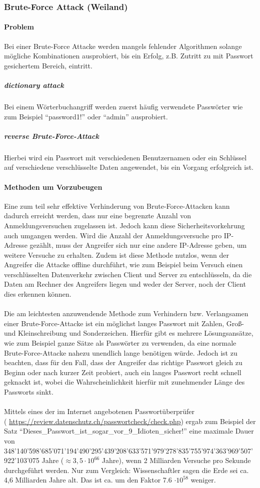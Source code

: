 \subsubsection{Brute-Force Attack (Weiland)}
\paragraph{Problem}
Bei einer Brute-Force Attacke werden mangels fehlender Algorithmen solange mögliche Kombinationen ausprobiert, bis ein Erfolg, z.B. Zutritt zu mit Passwort gesichertem Bereich, eintritt.
\subparagraph{dictionary attack}
Bei einem Wörterbuchangriff werden zuerst häufig verwendete Passwörter wie zum Beispiel \enquote{password1!} oder \enquote{admin} ausprobiert. 
\subparagraph{reverse Brute-Force-Attack}
Hierbei wird ein Passwort mit verschiedenen Benutzernamen oder ein Schlüssel auf verschiedene verschlüsselte Daten angewendet, bis ein Vorgang erfolgreich ist.
\paragraph{Methoden um Vorzubeugen}
Eine zum teil sehr effektive Verhinderung von Brute-Force-Attacken kann dadurch erreicht werden, dass nur eine begrenzte Anzahl von Anmeldungsversuchen  zugelassen ist. Jedoch kann diese Sicherheitsvorkehrung auch umgangen werden. Wird die Anzahl der Anmeldungsversuche pro IP-Adresse gezählt, muss der Angreifer sich nur eine andere IP-Adresse geben, um weitere Versuche zu erhalten. Zudem ist diese Methode nutzlos, wenn der Angreifer die Attacke offline durchführt, wie zum Beispiel beim Versuch einen verschlüsselten Datenverkehr zwischen Client und Server zu entschlüsseln, da die Daten am Rechner des Angreifers liegen und weder der Server, noch der Client dies erkennen können. \\\\
Die am leichtesten anzuwendende Methode zum Verhindern bzw. Verlangsamen einer Brute-Force-Attacke ist ein möglichst langes Passwort mit Zahlen, Groß- und Kleinschreibung und Sonderzeichen. Hierfür gibt es mehrere Lösungsansätze, wie zum Beispiel ganze Sätze als Passwörter zu verwenden, da eine normale Brute-Force-Attacke nahezu unendlich lange benötigen würde. Jedoch ist zu beachten, dass für den Fall, dass der Angreifer das richtige Passwort gleich zu Beginn oder nach kurzer Zeit probiert, auch ein langes Passwort recht schnell geknackt ist, wobei die Wahrscheinlichkeit hierfür mit zunehmender Länge des Passworts sinkt.\\
\\
Mittels eines der im Internet angebotenen Passwortüberprüfer \\( \href{https://review.datenschutz.ch/passwortcheck/check.php}{https://review.datenschutz.ch/passwortcheck/check.php}) ergab zum Beispiel der Satz \enquote{Dieses\_Passwort\_ist\_sogar\_vor\_9\_Idioten\_sicher!} eine maximale Dauer von\\ 348'140'598'685'071'194'490'295'439'208'633'571'979'278'835'755'974'363'969'507'922'103'075 Jahre ($\approx 3,5 \cdot 10^{66}$ Jahre), wenn 2 Milliarden Versuche pro Sekunde durchgeführt werden. Nur zum Vergleich: Wissenschaftler sagen die Erde sei ca. 4,6 Milliarden Jahre alt. Das ist ca. um den Faktor 7.6 $\cdot 10^{58}$ weniger.
